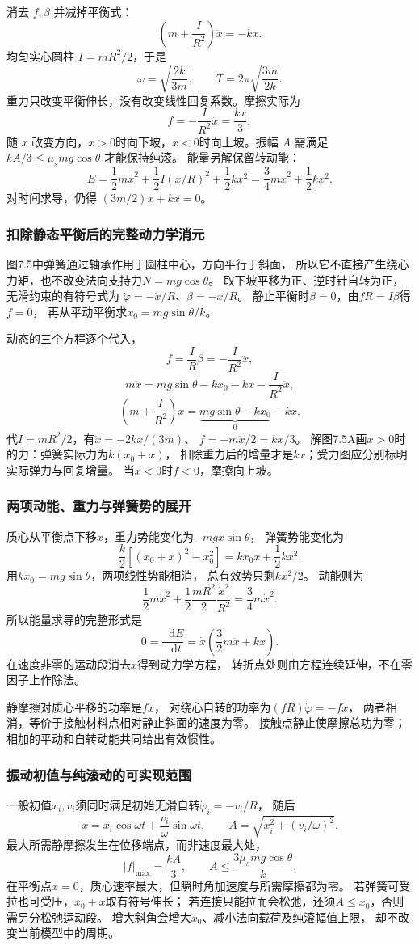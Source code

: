 \documentclass[UTF8,fontset=fandol,a4paper,11pt]{ctexart}
\newcommand{\dd}{\mathop{}\!\mathrm{d}}
\begin{document}
消去 $f,\beta$ 并减掉平衡式：
\[\left(m+\frac I{R^2}\right)\ddot x=-kx.\]
均匀实心圆柱 $I=mR^2/2$，于是
\[\boxed{\omega=\sqrt{\frac{2k}{3m}},\qquad
T=2\pi\sqrt{\frac{3m}{2k}}.}\]
重力只改变平衡伸长，没有改变线性回复系数。摩擦实际为
\[f=-\frac I{R^2}\ddot x=\frac{kx}{3},\]
随 $x$ 改变方向，$x>0$时向下坡，$x<0$时向上坡。振幅 $A$ 需满足 $kA/3\le\mu_smg\cos\theta$ 才能保持纯滚。
能量另解保留转动能：
\[E=\frac12m\dot x^2+\frac12I(\dot x/R)^2+\frac12kx^2
=\frac34m\dot x^2+\frac12kx^2.\]
对时间求导，仍得 $(3m/2)\ddot x+kx=0$。
\subsubsection*{扣除静态平衡后的完整动力学消元}
图7.5中弹簧通过轴承作用于圆柱中心，方向平行于斜面，
所以它不直接产生绕心力矩，也不改变法向支持力$N=mg\cos\theta$。
取下坡平移为正、逆时针自转为正，无滑约束的有符号式为
$\dot\varphi=-\dot x/R$、$\beta=-\ddot x/R$。
静止平衡时$\beta=0$，由$fR=I\beta$得$f=0$，
再从平动平衡求$x_0=mg\sin\theta/k$。

动态的三个方程逐个代入，
\[
f=\frac I R\beta=-\frac I{R^2}\ddot x,
\]
\[
m\ddot x=mg\sin\theta-kx_0-kx-\frac I{R^2}\ddot x,
\]
\[
\left(m+\frac I{R^2}\right)\ddot x
=\underbrace{mg\sin\theta-kx_0}_{0}-kx.
\]
代$I=mR^2/2$，有$\ddot x=-2kx/(3m)$、
$f=-m\ddot x/2=kx/3$。
解图7.5A画$x>0$时的力：弹簧实际力为$k(x_0+x)$，
扣除重力后的增量才是$kx$；受力图应分别标明实际弹力与回复增量。
当$x<0$时$f<0$，摩擦向上坡。

\subsubsection*{两项动能、重力与弹簧势的展开}
质心从平衡点下移$x$，重力势能变化为$-mgx\sin\theta$，
弹簧势能变化为
\[
\frac k2[(x_0+x)^2-x_0^2]=kx_0x+\frac12kx^2.
\]
用$kx_0=mg\sin\theta$，两项线性势能相消，
总有效势只剩$kx^2/2$。
动能则为
\[
\frac12m\dot x^2+\frac12\frac{mR^2}{2}
\frac{\dot x^2}{R^2}=\frac34m\dot x^2.
\]
所以能量求导的完整形式是
\[
0=\frac{\dd E}{\dd t}
=\dot x\left(\frac32m\ddot x+kx\right).
\]
在速度非零的运动段消去$\dot x$得到动力学方程，
转折点处则由方程连续延伸，不在零因子上作除法。

静摩擦对质心平移的功率是$f\dot x$，
对绕心自转的功率为$(fR)\dot\varphi=-f\dot x$，
两者相消，等价于接触材料点相对静止斜面的速度为零。
接触点静止使摩擦总功为零；相加的平动和自转动能共同给出有效惯性。

\subsubsection*{振动初值与纯滚动的可实现范围}
一般初值$x_i,v_i$须同时满足初始无滑自转$\dot\varphi_i=-v_i/R$，
随后
\[
x=x_i\cos\omega t+\frac{v_i}{\omega}\sin\omega t,
\qquad A=\sqrt{x_i^2+(v_i/\omega)^2}.
\]
最大所需静摩擦发生在位移端点，而非速度最大处，
\[
|f|_{\max}=\frac{kA}{3},\qquad
A\leq\frac{3\mu_smg\cos\theta}{k}.
\]
在平衡点$x=0$，质心速率最大，但瞬时角加速度与所需摩擦都为零。
若弹簧可受拉也可受压，$x_0+x$取有符号伸长；
若连接只能拉而会松弛，还须$A\leq x_0$，否则需另分松弛运动段。
增大斜角会增大$x_0$、减小法向载荷及纯滚幅值上限，
却不改变当前模型中的周期。
\end{document}
